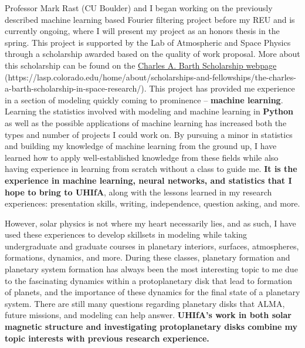\documentclass[11pt,letterpaper]{article}
\begin{document}
Professor Mark Rast (CU Boulder) and I began working on the previously described machine learning based Fourier filtering project before my REU and is currently ongoing, where I will present my project as an honors thesis in the spring. This project is supported by the Lab of Atmospheric and Space Physics through a scholarship awarded based on the quality of work proposal. More about this scholarship can be found on the \href{https://lasp.colorado.edu/home/about/scholarships-and-fellowships/the-charles-a-barth-scholarship-in-space-research/}{Charles A. Barth Scholarship webpage} (https://lasp.colorado.edu/home/about/scholarships-and-fellowships/the-charles-a-barth-scholarship-in-space-research/). This project has provided me experience in a section of modeling quickly coming to prominence -- \textbf{machine learning}. Learning the statistics involved with modeling and machine learning in \textbf{Python} as well as the possible applications of machine learning has increased both the types and number of projects I could work on. By pursuing a minor in statistics and building my knowledge of machine learning from the ground up, I have learned how to apply well-established knowledge from these fields while also having experience in learning from scratch without a class to guide me. \textbf{It is the experience in machine learning, neural networks, and statistics that I hope to bring to UHIfA}, along with the lessons learned in my research experiences: presentation skills, writing, independence, question asking, and more.

However, solar physics is not where my heart necessarily lies, and as such, I have used these experiences to develop skillsets in modeling while taking undergraduate and graduate courses in planetary interiors, surfaces, atmospheres, formations, dynamics, and more. During these classes, planetary formation and planetary system formation has always been the most interesting topic to me due to the fascinating dynamics within a protoplanetary disk that lead to formation of planets, and the importance of these dynamics for the final state of a planetary system. There are still many questions regarding planetary disks that ALMA, future missions, and modeling can help answer. \textbf{UHIfA's work in both solar magnetic structure and investigating protoplanetary disks combine my topic interests with previous research experience.}
\end{document}
